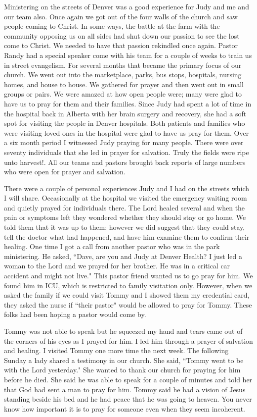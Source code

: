 \documentclass[oneside,12pt]{book}
\begin{document}
Ministering on the streets of Denver was a good experience for Judy and me and our team also. Once again we got out of the four walls of the church and saw people coming to Christ. In some ways, the battle at the farm with the community opposing us on all sides had shut down our passion to see the lost come to Christ. We needed to have that passion rekindled once again. Pastor Randy had a special speaker come with his team for a couple of weeks to train us in street evangelism. For several months that became the primary focus of our church. We went out into the marketplace, parks, bus stops, hospitals, nursing homes, and house to house. We gathered for prayer and then went out in small groups or pairs. We were amazed at how open people were; many were glad to have us to pray for them and their families. Since Judy had spent a lot of time in the hospital back in Alberta with her brain surgery and recovery, she had a soft spot for visiting the people in Denver hospitals. Both patients and families who were visiting loved ones in the hospital were glad to have us pray for them. Over a six month period I witnessed Judy praying for many people. There were over seventy individuals that she led in prayer for salvation. Truly the fields were ripe unto harvest!. All our teams and pastors brought back reports of large numbers who were open for prayer and salvation. 


There were a couple of personal experiences Judy and I had on the streets which I will share. Occasionally at the hospital we visited the emergency waiting room and quietly prayed for individuals there. The Lord healed several and when the pain or symptoms left they wondered whether they should stay or go home. We told them that it was up to them; however we did  suggest that they could stay, tell the doctor what had happened, and have him examine them to confirm their healing. One time I got a call from another pastor who was in the park ministering. He asked, ``Dave, are you and Judy at Denver Health? I just led a woman to the Lord and we prayed for her brother. He was in a critical car accident and might not live." This pastor friend wanted us to go pray for him. We found him in ICU, which is restricted to family visitation only. However, when we asked the family if we could visit Tommy and I showed them my credential card, they asked the nurse if ``their pastor" would be allowed to pray for Tommy. These folks had been hoping a pastor would come by. 

Tommy was not able to speak but he squeezed my hand and tears came out of the corners of his eyes as I prayed for him. I led him through a prayer of salvation and healing. I visited Tommy one more time the next week. The following Sunday a lady shared a testimony in our church. She said, ``Tommy went to be with the Lord yesterday." She wanted to thank our church for praying for him before he died. She said he was able to speak for a couple of minutes and told her that God had sent a man to pray for him. Tommy said he had a vision of Jesus standing beside his bed and he had peace that he was going to heaven. You never know how important it is to pray for someone even when they seem incoherent. 
\end{document}
